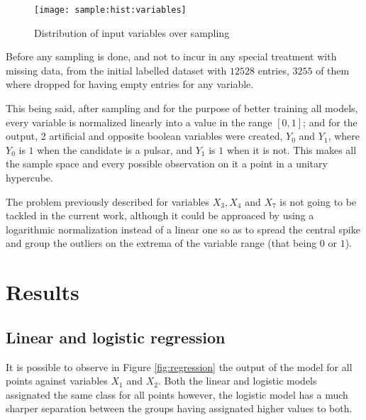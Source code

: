 \documentclass[journal]{IEEEtran}
\begin{document}
\begin{figure*}[ht]
    \texttt{[image: sample:hist:variables]}
    \caption{Distribution of input variables over sampling \label{fig:sample:hist:variables}}
\end{figure*}

Before any sampling is done, and not to incur in any special treatment with
missing data, from the initial labelled dataset with $12528$ entries, $3255$ of
them where dropped for having empty entries for any variable. 

This being said, after sampling and for the purpose of better training all
models, every variable is normalized linearly into a value in the range $[0,1]$;
and for the output, 2 artificial and opposite boolean variables were created,
$Y_0$ and $Y_1$, where $Y_0$ is $1$ when the candidate is a pulsar, and $Y_1$ is
$1$ when it is not. This makes all the sample space and every possible
observation on it a point in a unitary hypercube.

The problem previously described for variables $X_3, X_4$ and $X_7$ is not going
to be tackled in the current work, although it could be approaced by using a
logarithmic normalization instead of a linear one so as to spread the central
spike and group the outliers on the extrema of the variable range (that being
$0$ or $1$).

\section{Results}

\subsection{Linear and logistic regression}
It is possible to observe in Figure \ref{fig:regression} the output of the model
for all points against variables $X_1$ and $X_2$. Both the linear and logistic
models assignated the same class for all points however, the logistic model has
a much sharper separation between the groups having assignated higher values
to both.
\end{document}
